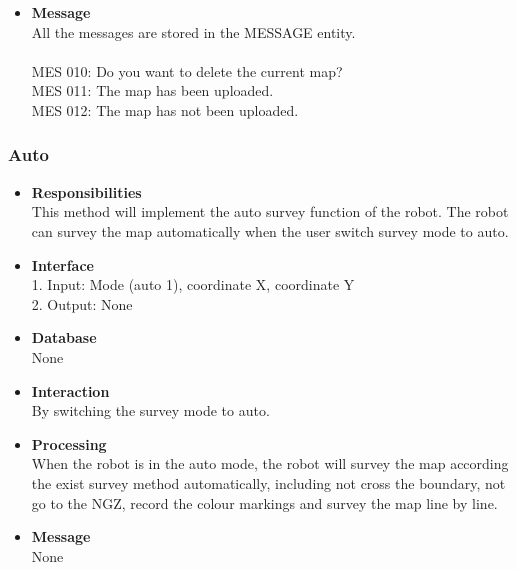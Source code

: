 \documentclass[11pt, a4paper]{article}
\begin{document}
\begin{itemize}
\item {\bfseries Message }\\
All the messages are stored in the MESSAGE entity.\\
\\
MES 010: Do you want to delete the current map? \\
MES 011: The map has been uploaded.\\
MES 012: The map has not been uploaded.\\
\end{itemize}

\subsubsection{Auto}
\begin{itemize}
\item {\bfseries Responsibilities }\\
This method will implement the auto survey function of the robot. The robot can survey the map automatically when the user switch survey mode to auto.\\

\item {\bfseries Interface }\\
1. Input: Mode (auto 1), coordinate X, coordinate Y\\
2. Output: None\\

\item {\bfseries Database }\\
None

\item {\bfseries Interaction }\\
By switching the survey mode to auto.\\

\item {\bfseries Processing }\\
When the robot is in the auto mode, the robot will survey the map according the exist survey method automatically, including not cross the boundary, not go to the NGZ, record the colour markings and survey the map line by line.\\

\item {\bfseries Message }\\
None
\end{itemize}

\end{document}
